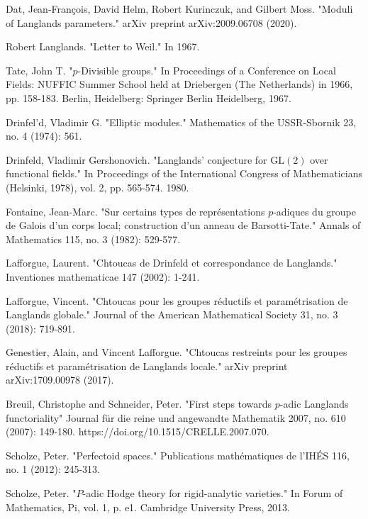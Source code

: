 \documentclass[12pt]{book}
\theoremstyle{definition}
\begin{document}
\begin{thebibliography}{}
 Dat, Jean-Fran\c{c}ois, David Helm, Robert Kurinczuk, and Gilbert Moss. "Moduli of Langlands parameters." arXiv preprint arXiv:2009.06708 (2020).

 Robert Langlands. "Letter to Weil." In 1967.

 Tate, John T. "$p$-Divisible groups." In Proceedings of a Conference on Local Fields: NUFFIC Summer School held at Driebergen (The Netherlands) in 1966, pp. 158-183. Berlin, Heidelberg: Springer Berlin Heidelberg, 1967. 

 Drinfel'd, Vladimir G. "Elliptic modules." Mathematics of the USSR-Sbornik 23, no. 4 (1974): 561.

 Drinfeld, Vladimir Gershonovich. "Langlands' conjecture for $\mathrm{GL}(2)$ over functional fields." In Proceedings of the International Congress of Mathematicians (Helsinki, 1978), vol. 2, pp. 565-574. 1980. 

 Fontaine, Jean-Marc. "Sur certains types de repr\'esentations $p$-adiques du groupe de Galois d'un corps local; construction d'un anneau de Barsotti-Tate." Annals of Mathematics 115, no. 3 (1982): 529-577.

 Lafforgue, Laurent. "Chtoucas de Drinfeld et correspondance de Langlands." Inventiones mathematicae 147 (2002): 1-241.

 Lafforgue, Vincent. "Chtoucas pour les groupes r\'eductifs et param\'etrisation de Langlands globale." Journal of the American Mathematical Society 31, no. 3 (2018): 719-891.

 Genestier, Alain, and Vincent Lafforgue. "Chtoucas restreints pour les groupes r\'eductifs et param\'etrisation de Langlands locale." arXiv preprint arXiv:1709.00978 (2017).

 Breuil, Christophe and Schneider, Peter. "First steps towards $p$-adic Langlands functoriality" Journal f\"ur die reine und angewandte Mathematik 2007, no. 610 (2007): 149-180. https://doi.org/10.1515/CRELLE.2007.070.

 Scholze, Peter. "Perfectoid spaces." Publications math\'ematiques de l'IH\'ES 116, no. 1 (2012): 245-313.

 Scholze, Peter. "$P$-adic Hodge theory for rigid-analytic varieties." In Forum of Mathematics, Pi, vol. 1, p. e1. Cambridge University Press, 2013. 


\end{thebibliography}
\end{document}
